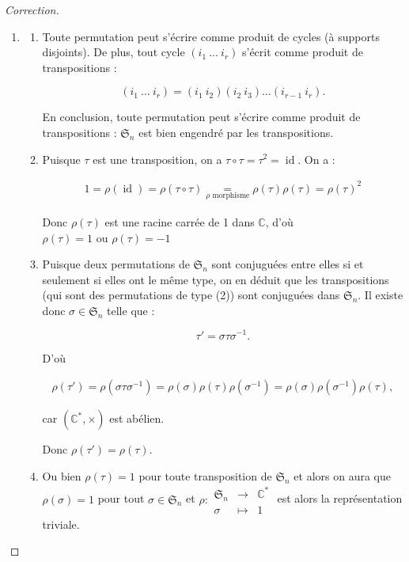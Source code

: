 \documentclass[french]{book}
\theoremstyle{definition}
\theoremstyle{remark}
\begin{document}
\begin{proof}[Correction]

  \

  \begin{enumerate}
    \item \begin{enumerate}
      \item Toute permutation peut s'écrire comme produit de cycles (à supports disjoints). De plus, tout cycle \((i_1 \ \dots \ i_r)\) s'écrit comme produit de transpositions :

      \[(i_1 \ \dots \ i_r) = (i_1 \ i_2) (i_2 \ i_3) \dots (i _{r-1} \ i_r).\]

      En conclusion, toute permutation peut s'écrire comme produit de transpositions : \(\mathfrak{S}_n\) est bien engendré par les transpositions.
      \item Puisque \(\tau\) est une transposition, on a \(\tau \circ \tau = \tau^2 = \operatorname{id}\). On a :

      \begin{gather*}
        1 = \rho(\operatorname{id}) = \rho(\tau \circ \tau) \underset{\rho \text{ morphisme}}{=} \rho(\tau) \rho(\tau) = \rho(\tau)^2
      \end{gather*}

      Donc \(\rho(\tau)\) est une racine carrée de 1 dans \(\mathbb{C}\), d'où \(\rho(\tau)=1 \text{ ou } \rho(\tau)=-1 \)

      \item Puisque deux permutations de \(\mathfrak{S}_n\) sont conjuguées entre elles si et seulement si elles ont le même type, on en déduit que les transpositions (qui sont des permutations de type (2)) sont conjuguées dans \(\mathfrak{S}_n\). Il existe donc \(\sigma \in \mathfrak{S}_n\) telle que :

      \[\tau' = \sigma \tau \sigma ^{-1}.\]

      D'où

      \begin{gather*}
        \rho(\tau') = \rho(\sigma \tau \sigma ^{-1}) = \rho(\sigma)\rho(\tau)\rho(\sigma^{-1}) = \rho(\sigma) \rho(\sigma ^{-1}) \rho(\tau),
      \end{gather*}

      car \((\mathbb{C}^{*}, \times)\) est abélien.

      Donc \(\rho(\tau') = \rho(\tau)\).

      \item Ou bien \(\rho(\tau)=1\) pour toute transposition de \(\mathfrak{S}_n\) et alors on aura que \(\rho(\sigma) = 1\) pour tout \(\sigma \in \mathfrak{S}_n\) et \(\rho :\begin{matrix}
      \mathfrak{S}_n & \longrightarrow & \mathbb{C}^{*} \\
       \sigma & \longmapsto & 1
      \end{matrix} \) est alors la représentation triviale.


\end{enumerate}
\end{enumerate}
\end{proof}
\end{document}
